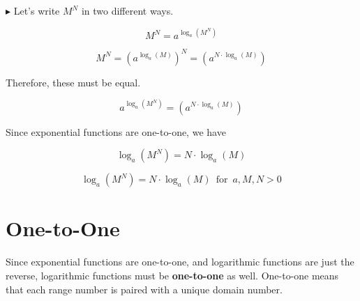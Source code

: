 \documentclass{ximera}
\begin{document}
$\blacktriangleright$  Let's write $M^N$ in two different ways.



\[   M^N = a^{\log_a(M^N)}                  \]

\[   M^N = (a^{\log_a(M)})^N =     (a^{N \cdot \log_a(M)})             \]


Therefore, these must be equal.


\[    a^{\log_a(M^N)}      =    (a^{N \cdot \log_a(M)})                \]





Since exponential functions are one-to-one, we have 


\[    \log_a(M^N)    =   N \cdot \log_a(M)            \]








\begin{template} 

\[    \log_a(M^N)    =   N \cdot \log_a(M)       \, \text{ for } \, a, M, N  > 0        \]


\end{template}


















\section{One-to-One}







Since exponential functions are one-to-one, and logarithmic functions are just the reverse, logarithmic functions must be \textbf{one-to-one} as well. One-to-one means that each range number is paired with a unique domain number.
\end{document}

